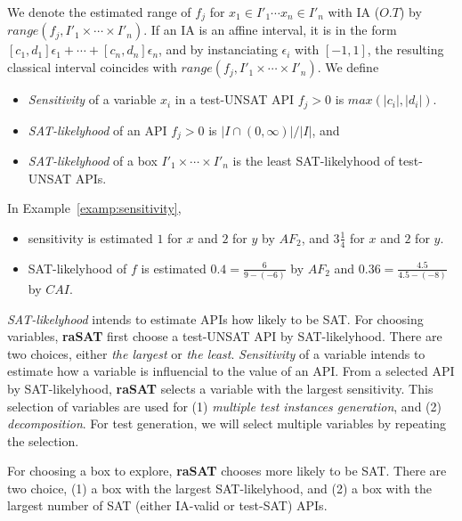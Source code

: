 \documentclass[runningheads,a4paper,oribibl]{llncs}
\begin{document}
We denote the estimated range of $f_j$ for $x_1 \in I'_1 \cdots x_n \in I'_n$ with IA ($O.T$)
by $range(f_j, I'_1 \times \cdots \times I'_n)$. 
If an IA is an affine interval, 
it is in the form $[c_1,d_1]\epsilon_1 + \cdots + [c_n,d_n]\epsilon_n$, 
and by instanciating $\epsilon_i$ with $[-1,1]$, 
the resulting classical interval coincides with $range(f_j, I'_1 \times \cdots \times I'_n)$. 
We define 
\begin{itemize} 
\item {\em Sensitivity} of a variable $x_i$ in a test-UNSAT API $f_j > 0$ is $max(|c_i|, |d_i|)$. 
\item {\em SAT-likelyhood} of an API $f_j > 0$ is $| I \cap (0,\infty) | / |I|$, and 
\item {\em SAT-likelyhood} of a box $I'_1 \times \cdots \times I'_n$ is 
the least SAT-likelyhood of test-UNSAT APIs. 
\end{itemize} 

\begin{example} \label{examp:SATlikelyhood}
In Example~\ref{examp:sensitivity}, 
\begin{itemize}
\item sensitivity is estimated $1$ for $x$ and $2$ for $y$ by $AF_2$, and $3\frac{1}{4}$ for $x$ and 
$2$ for $y$. 
\item SAT-likelyhood of $f$ is estimated $0.4= \frac{6}{9-(-6)}$ by $AF_2$ 
and $0.36 = \frac{4.5}{4.5-(-8)}$ by $CAI$. 
\end{itemize}
\end{example}


{\em SAT-likelyhood} intends to estimate APIs how likely to be SAT. 
For choosing variables, {\bf raSAT} first choose a test-UNSAT API by SAT-likelyhood. 
There are two choices, either {\em the largest} or {\em the least}. 
{\em Sensitivity} of a variable intends to estimate how a variable is influencial to the value of an API. 
From a selected API by SAT-likelyhood, {\bf raSAT} selects a variable with the largest sensitivity. 
This selection of variables are used for (1) {\em multiple test instances generation}, and 
(2) {\em decomposition}. 
For test generation, we will select multiple variables by repeating the selection. 

For choosing a box to explore, {\bf raSAT} chooses more likely to be SAT. 
There are two choice, (1) a box with the largest SAT-likelyhood, and 
(2) a box with the largest number of SAT (either IA-valid or test-SAT) APIs. 
\end{document}
